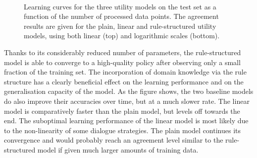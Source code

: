 \begin{figure}[p!]
\begin{center}\end{center} $\phantom{a}$\vspace{8mm}$\phantom{a}$ 
\begin{center}\end{center}
\caption{Learning curves for the three utility models on the test set as a function of the number of processed data points.  The agreement results are given for the plain, linear and rule-structured utility models, using both linear (top) and logarithmic scales (bottom).}
\label{results}
\end{figure}


Thanks to its considerably reduced number of parameters, the rule-structured model is able to converge to a high-quality policy after observing only a small fraction of the training set.  The incorporation of domain knowledge via the rule structure has a clearly beneficial effect on the learning performance and on the generalisation capacity of the model.  As the figure shows, the two baseline models do also improve their accuracies over time, but at a much slower rate.   The linear model is comparatively faster than the plain model, but levels off towards the end. The suboptimal learning performance of the linear model is most likely due to the non-linearity of some dialogue strategies.  The plain model continues its convergence and would probably reach an agreement level similar to the rule-structured model if given much larger amounts of training data. 

